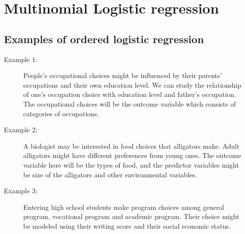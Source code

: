 \documentclass[]{article}
\begin{document}
\section*{Multinomial Logistic regression}
 
\subsection*{Examples of ordered logistic regression}
\begin{description}
\item[Example 1:] People's occupational choices might be influenced by their parents' occupations and their own education level. We can study the relationship of one's occupation choice with education level and father's occupation. The occupational choices will be the outcome variable which consists of categories of occupations.

\item[Example 2:] A biologist may be interested in food choices that alligators make. Adult alligators might have different preferences from young ones. The outcome variable here will be the types of food, and the predictor variables might be size of the alligators and other environmental variables.

\item[Example 3:] Entering high school students make program choices among general program, vocational program and academic program. Their choice might be modeled using their writing score and their social economic status.
\end{description}
\end{document}
